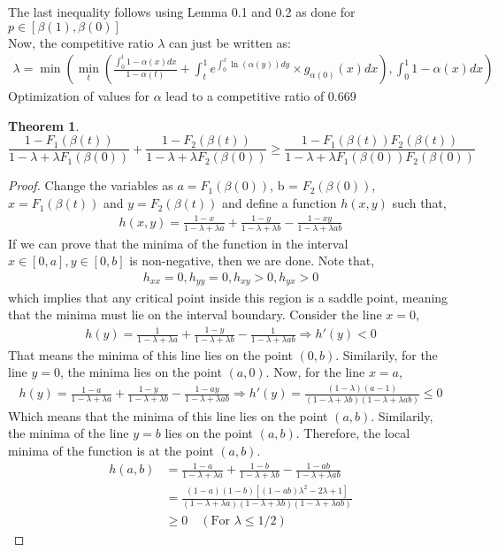 \documentclass[10pt, letterpaper, twoside]{article}
\newtheorem{theorem}{Theorem}[section]
\begin{document}
	The last inequality follows using Lemma 0.1 and 0.2 as done for $p \in [\beta(1),\beta(0)]$\\
	Now, the competitive ratio $\lambda$ can just be written as:
	\begin{align*}
	\lambda = \min \left(\min_{t}\left(\frac{\int_{0}^{t} 1 - \alpha(x) dx}{1-\alpha(t)} + \int_{t}^{1} e^{\int_{0}^{x} \ln(\alpha(y)) dy} \times g_{\alpha(0)}(x) dx \right), \int_{0}^{1} 1 - \alpha(x) dx \right)
	\end{align*}
	Optimization of values for $\alpha$ lead to a competitive ratio of 0.669\\
	\begin{theorem}
	$$\frac{1-F_{1}(\beta(t))}{1-\lambda+\lambda F_{1}(\beta(0))} + \frac{1-F_{2}(\beta(t))}{1-\lambda+\lambda F_{2}(\beta(0))} \geq \frac{1-F_{1}(\beta(t))F_{2}(\beta(t))}{1-\lambda+\lambda F_{1}(\beta(0))F_{2}(\beta(0))}$$
	\end{theorem}
\begin{proof}
	Change the variables as $a = F_{1}(\beta(0))$, b = $F_{2}(\beta(0))$, $x = F_{1}(\beta(t))$ and $y = F_{2}(\beta(t))$ and define a function $h(x,y)$ such that,
	\begin{align*}
	h(x,y) = \frac{1-x}{1-\lambda+\lambda a} + \frac{1-y}{1-\lambda+\lambda b} - \frac{1-xy}{1-\lambda+\lambda ab}
	\end{align*}
	If we can prove that the minima of the function in the interval $x \in [0,a], y\in [0,b]$ is non-negative, then we are done. Note that,
	\begin{align*}
	h_{xx} = 0, h_{yy} = 0, h_{xy} > 0, h_{yx} > 0
	\end{align*}
	which implies that any critical point inside this region is a saddle point, meaning that the minima must lie on the interval boundary. Consider the line $x=0$,
	\begin{align*}
	h(y) = \frac{1}{1-\lambda+\lambda a} + \frac{1-y}{1-\lambda+\lambda b} - \frac{1}{1-\lambda+\lambda ab} \Rightarrow h'(y) < 0
	\end{align*}
	That means the minima of this line lies on the point $(0,b)$. Similarily, for the line $y = 0$, the minima lies on the point $(a,0)$. Now, for the line $x = a$,
	\begin{align*}
	h(y) = \frac{1-a}{1-\lambda+\lambda a} + \frac{1-y}{1-\lambda+\lambda b} - \frac{1-ay}{1-\lambda+\lambda ab} \Rightarrow h'(y) = \frac{(1 - \lambda)(a-1)}{(1-\lambda+\lambda b)(1-\lambda+\lambda ab)} \leq 0
	\end{align*}
	Which means that the minima of this line lies on the point $(a,b)$. Similarily, the minima of the line $y=b$ lies on the point $(a,b)$. Therefore, the local minima of the function is at the point $(a,b)$.
	\begin{align*}
	h(a,b) &= \frac{1-a}{1-\lambda+\lambda a} + \frac{1-b}{1-\lambda+\lambda b} - \frac{1-ab}{1-\lambda+\lambda ab} \\
	&= \frac{(1-a)(1-b)[(1-ab)\lambda^2 - 2\lambda + 1]}{(1-\lambda+\lambda a)(1-\lambda+\lambda b)(1-\lambda+\lambda ab)}\\
	&\geq 0  \quad (\text{For $\lambda \leq 1/2$})
	\end{align*}
\end{proof}



\end{document}
